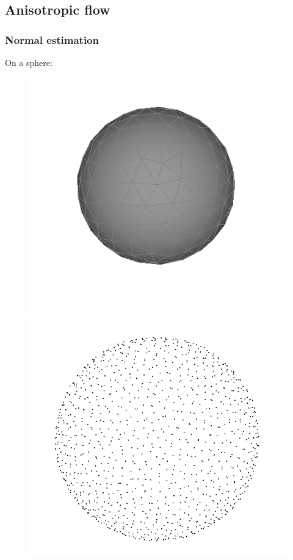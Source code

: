 \documentclass{beamer}
\begin{document}
\subsection{Anisotropic flow}
\begin{frame}
    \frametitle{Normal estimation}

    On a sphere:
    \begin{figure}
        \centering
        \includegraphics[scale=0.22]{img/sphere-polyhedron-200}
        \includegraphics[scale=0.2]{img/sphere-1000}

\end{figure}
\end{frame}
\end{document}
